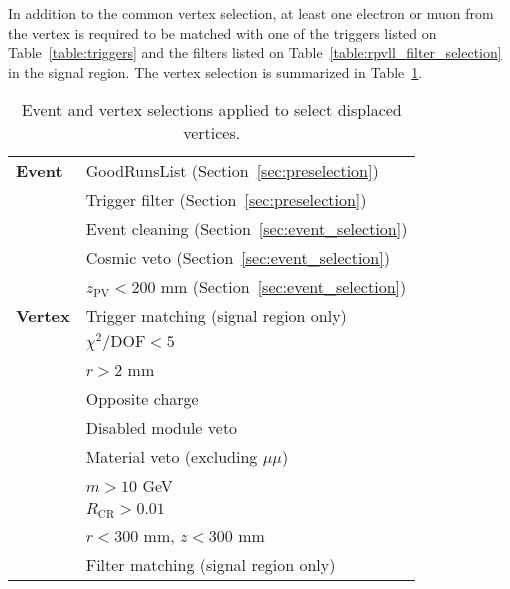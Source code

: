 In addition to the common vertex selection, at least one electron or muon from the vertex is required to be matched with one of the triggers listed on Table~\ref{table:triggers} and the filters listed on Table~\ref{table:rpvll_filter_selection} in the signal region. The vertex selection is summarized in Table~\ref{table:signal_selection}.

\begin{table}[!htb]
  \centering
  \begin{tabular}{ l  l }
    \hline
    \hline
    \textbf{Event}           &       GoodRunsList (Section~\ref{sec:preselection})                               \\
                             &       Trigger filter (Section~\ref{sec:preselection})                             \\
                             &       Event cleaning (Section~\ref{sec:event_selection})                          \\
                             &       Cosmic veto    (Section~\ref{sec:event_selection})                          \\
                             &       $z_{\mathrm{PV}} < 200$ mm (Section~\ref{sec:event_selection})                       \\
    \hline
    \textbf{Vertex}&       Trigger matching (signal region only)                                          \\
                             &       $\chi^2 / \mathrm{ DOF} < 5$                                                \\
                             &       $r > $2 mm                                                           \\
                             &       Opposite charge                                                             \\
                             &       Disabled module veto                                                        \\
                             &       Material veto (excluding $\mu\mu$)                                                              \\
                             &       $m > 10$ GeV                                                                \\
                             &       $R_{\mathrm{CR}} > 0.01$                                                    \\
                             &       $r < 300$ \si{mm}, $z < 300$ \si{mm}                                        \\
                             &       Filter matching (signal region only)                                                            \\
    \hline
    \hline
  \end{tabular}
  \caption{Event and vertex selections applied to select displaced vertices.}
  \label{table:signal_selection}
\end{table}


